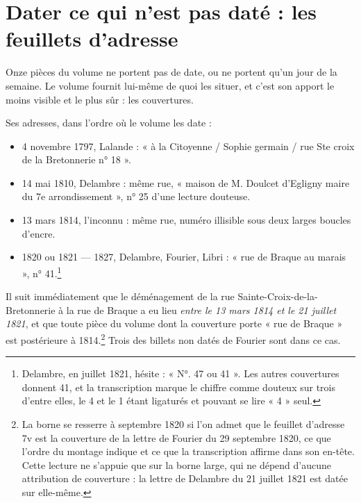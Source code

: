 \documentclass[11pt,a4paper]{article}
\begin{document}
\section*{Dater ce qui n'est pas daté : les feuillets d'adresse}

Onze pièces du volume ne portent pas de date, ou ne portent qu'un jour de la
semaine. Le volume fournit lui-même de quoi les situer, et c'est son apport le
moins visible et le plus sûr : les couvertures.

Ses adresses, dans l'ordre où le volume les date :
\begin{itemize}
  \item 4 novembre 1797, Lalande : « à la Citoyenne / Sophie germain / rue Ste
    croix de la Bretonnerie n° 18 ».
  \item 14 mai 1810, Delambre : même rue, « maison de M. Doulcet d'Egligny
    maire du 7e arrondissement », n° 25 d'une lecture douteuse.
  \item 13 mars 1814, l'inconnu : même rue, numéro illisible sous deux larges
    boucles d'encre.
  \item 1820 ou 1821 --- 1827, Delambre, Fourier, Libri : « rue de Braque au
    marais », n° 41.\footnote{Delambre, en juillet 1821, hésite : « N°. 47 ou
    41 ». Les autres couvertures donnent 41, et la transcription marque le
    chiffre comme douteux sur trois d'entre elles, le 4 et le 1 étant ligaturés
    et pouvant se lire « 4 » seul.}
\end{itemize}

Il suit immédiatement que le déménagement de la rue Sainte-Croix-de-la-
Bretonnerie à la rue de Braque a eu lieu \emph{entre le 13 mars 1814 et le 21
juillet 1821}, et que toute pièce du volume dont la couverture porte « rue de
Braque » est postérieure à 1814.\footnote{La borne se resserre à septembre 1820
si l'on admet que le feuillet d'adresse 7v est la couverture de la lettre de
Fourier du 29 septembre 1820, ce que l'ordre du montage indique et ce que la
transcription affirme dans son en-tête. Cette lecture ne s'appuie que sur la
borne large, qui ne dépend d'aucune attribution de couverture : la lettre de
Delambre du 21 juillet 1821 est datée sur elle-même.} Trois des billets non
datés de Fourier sont dans ce cas.
\end{document}
